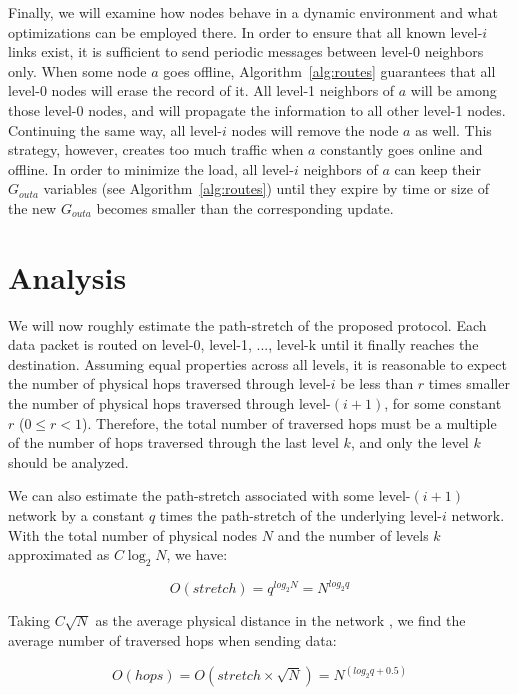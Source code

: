 \documentclass[14pt]{extarticle}
\theoremstyle{definition}
\begin{document}
Finally, we will examine how nodes behave in a dynamic environment and what optimizations can be employed there. In order to ensure that all known level-$i$ links exist, it is sufficient to send periodic messages between level-0 neighbors only. When some node $a$ goes offline, Algorithm~\ref{alg:routes} guarantees that all level-0 nodes will erase the record of it. All level-1 neighbors of $a$ will be among those level-0 nodes, and will propagate the information to all other level-1 nodes. Continuing the same way, all level-$i$ nodes will remove the node $a$ as well. This strategy, however, creates too much traffic when $a$ constantly goes online and offline. In order to minimize the load, all level-$i$ neighbors of $a$ can keep their $G_{outa}$ variables (see Algorithm~\ref{alg:routes}) until they expire by time or size of the new $G_{outa}$ becomes smaller than the corresponding update.


\section{Analysis}

We will now roughly estimate the path-stretch of the proposed protocol. Each data packet is routed on level-0, level-1, ..., level-k until it finally reaches the destination. Assuming equal properties across all levels, it is reasonable to expect the number of physical hops traversed through level-$i$ be less than $r$ times smaller the number of physical hops traversed through level-$(i+1)$, for some constant $r$ ($0 \le r < 1$). Therefore, the total number of traversed hops must be a multiple of the number of hops traversed through the last level $k$, and only the level $k$ should be analyzed.

We can also estimate the path-stretch associated with some level-$(i+1)$ network by a constant $q$ times the path-stretch of the underlying level-$i$ network. With the total number of physical nodes $N$ and the number of levels $k$ approximated as $C\log_2 N$, we have:

\begin{equation*}
    O(stretch) = q^{\displaystyle log_2 N} = N^{\displaystyle log_2 q}
\end{equation*}

Taking $C\sqrt{N}$ as the average physical distance in the network \cite{Kleinrock}, we find the average number of traversed hops when sending data:

\begin{equation*}
    O(hops) = O(stretch \times \sqrt{N}) = N^{\displaystyle (log_2 q + 0.5)}
\end{equation*}
\end{document}
